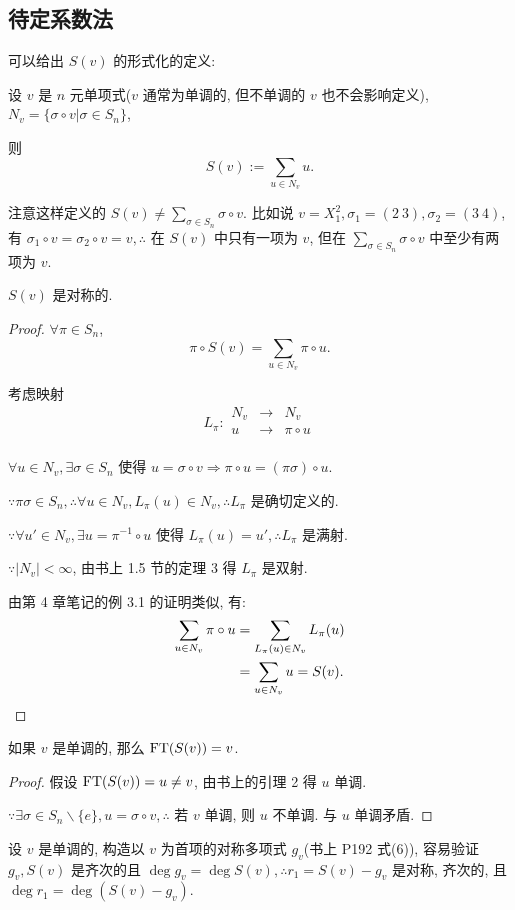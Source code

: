 \documentclass[color=black,device=normal,lang=cn,mode=geye]{elegantnote}
\begin{document}
\subsection{待定系数法}
可以给出 $S(v)$ 的形式化的定义:
\begin{definition}
    设 $v$ 是 $n$ 元单项式($v$ 通常为单调的, 但不单调的 $v$ 也不会影响定义), $N_v=\{\sigma\circ v|\sigma\in S_n\}$,
    
    则
    \[S(v):=\sum_{u\in N_v}u.\]
\end{definition}
注意这样定义的 $S(v)\neq\sum\limits_{\sigma\in S_n}\sigma\circ v$. 比如说 $v=X_1^2,\sigma_1=(2\ 3),\sigma_2=(3\ 4)$, 有 $\sigma_1\circ v=\sigma_2\circ v=v,\therefore$ 在 $S(v)$ 中只有一项为 $v$, 但在 $\sum\limits_{\sigma\in S_n}\sigma\circ v$ 中至少有两项为 $v$.
\begin{theorem}
    $S(v)$ 是对称的.
\end{theorem}
\begin{proof}
    $\forall\pi\in S_n$,
    \[\pi\circ S(v)=\sum_{u\in N_v}\pi\circ u.\]

    考虑映射
    \[L_\pi:\begin{array}{rcl}
        N_v & \to & N_v \\
        u & \to & \pi\circ u \\
    \end{array}\]

    $\forall u\in N_v,\exists\sigma\in S_n$ 使得 $u=\sigma\circ v\Rightarrow\pi\circ u=(\pi\sigma)\circ u$.

    $\because\pi\sigma\in S_n,\therefore\forall u\in N_v,L_\pi(u)\in N_v,\therefore L_\pi$ 是确切定义的.

    $\because\forall u'\in N_v,\exists u=\pi^{-1}\circ u$ 使得 $L_\pi(u)=u',\therefore L_\pi$ 是满射.

    $\because|N_v|<\infty$, 由书上 1.5 节的定理 3 得 $L_\pi$ 是双射.
    
    由第 4 章笔记的例 3.1 的证明类似, 有:
    \begin{align*}
        \sum_{u\in N_v}\pi\circ u & =\sum_{L_\pi(u)\in N_v}L_\pi(u) \\
        & =\sum_{u\in N_v}u=S(v).\qedhere
    \end{align*}
\end{proof}
\begin{theorem}
    如果 $v$ 是单调的, 那么 $\operatorname{FT} (S(v))=v$.
\end{theorem}
\begin{proof}
    假设 $\operatorname{FT} (S(v))=u\neq v$, 由书上的引理 2 得 $u$ 单调.

    $\because\exists\sigma\in S_n\backslash\{e\},u=\sigma\circ v,\therefore$ 若 $v$ 单调, 则 $u$ 不单调. 与 $u$ 单调矛盾.
\end{proof}
设 $v$ 是单调的, 构造以 $v$ 为首项的对称多项式 $g_v$(书上 P192 式(6)), 容易验证 $g_v,S(v)$ 是齐次的且 $\deg g_v=\deg S(v),\therefore r_1=S(v)-g_v$ 是对称, 齐次的, 且 $\deg r_1=\deg(S(v)-g_v)$.
\end{document}
